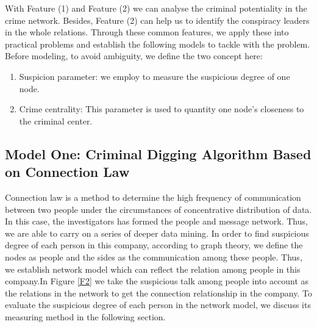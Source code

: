 \documentclass[12pt]{article}
\begin{document}
	With Feature (1) and Feature (2) we can analyse the criminal potentiality in the crime network. Besides, Feature (2) can help us to identify the conspiracy leaders in the whole relations.
	Through these common features, we apply these into practical problems and establish the following models to tackle with the problem.
	Before modeling, to avoid ambiguity, we define the two concept here:
\begin{enumerate}
\item Suspicion parameter: we employ to measure the suspicious degree of one node.
\item Crime centrality: This parameter is used to quantity one node’s closeness to the criminal center.
\end{enumerate}


\subsection{Model One: Criminal Digging Algorithm Based on Connection Law}
	Connection law is a method to determine the high frequency of communication between two people under the circumstances of concentrative distribution of data. In this case, the investigators has formed the people and message network. Thus, we are able to carry on a series of deeper data mining.
	In order to find suspicious degree of each person in this company, according to graph theory, we define the nodes as people and the sides as the communication among these people. Thus, we establish network model which can reflect the relation among people in this company.In Figure \ref{F2} we take the suspicious talk among people into account as the relations in the network to get the connection relationship in the company.
         To evaluate the suspicious degree  of each person in the network model, we discuss its measuring method in the following section.
\end{document}
